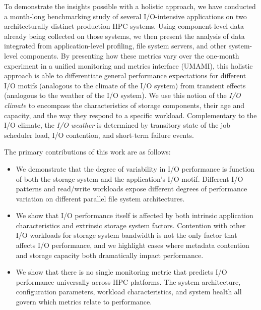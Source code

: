 To demonstrate the insights possible with a holistic approach, we have conducted a month-long benchmarking study of several I/O-intensive applications on two architecturally distinct production HPC systems.
Using component-level data already being collected on those systems, we then present the analysis of data integrated from application-level profiling, file system servers, and other system-level components.
By presenting how these metrics vary over the one-month experiment in a unified monitoring and metrics interface (UMAMI), this holistic approach is able to differentiate general performance expectations for different I/O motifs (analogous to the climate of the I/O system) from transient effects (analogous to the weather of the I/O system).
We use this notion of the \emph{I/O climate} to encompass the characteristics of storage components, their age and capacity, and the way they respond to a specific workload.
Complementary to the I/O climate, the \emph{I/O weather} is determined by transitory state of the job scheduler load, I/O contention, and short-term failure events.

The primary contributions of this work are as follows:
\begin{itemize}[leftmargin=*]
\item We demonstrate that the degree of variability in I/O performance is function of both the storage system and the application's I/O motif.
Different I/O patterns and read/write workloads expose different degrees of performance variation on different parallel file system architectures.
\item We show that I/O performance itself is affected by both intrinsic application characteristics and extrinsic storage system factors.
Contention with other I/O workloads for storage system bandwidth is not the only factor that affects I/O performance, and
we highlight cases where metadata contention and storage capacity both dramatically impact performance.
\item We show that there is no single monitoring metric that predicts I/O performance universally across HPC platforms.
The system architecture, configuration parameters, workload characteristics, and system health all govern which metrics relate to performance.
\end{itemize}
